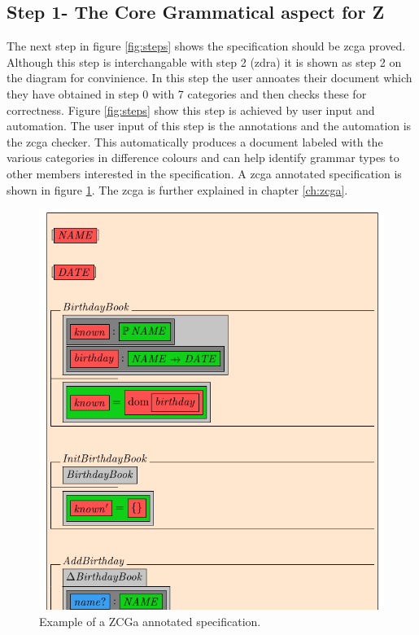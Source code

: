 \subsection{Step 1- The Core Grammatical aspect for Z}

The next step in figure \ref{fig:steps} shows the specification should be \gls{zcga} proved. Although this step is interchangable with step 2 (\gls{zdra}) it is shown as step 2 on the diagram for convinience. In this step the user annoates their document which they have obtained in step 0 with 7 categories and then checks these for correctness. Figure \ref{fig:steps} show this step is achieved by user input and automation. The user input of this step is the annotations and the automation is the \gls{zcga} checker. This automatically produces a document labeled with the various categories in difference colours and can help identify grammar types to other members interested in the specification. A \gls{zcga} annotated specification is shown in figure \ref{fig:zcgaexample}. The \gls{zcga} is further explained in chapter \ref{ch:zcga}.

\begin{figure}[H]
 \begin{center}
 \includegraphics [scale=0.25]{Figures/Design/zcgaexample.png}
 \caption{Example of a ZCGa annotated specification.}
 \label{fig:zcgaexample}
\end{center}
\end{figure} 

